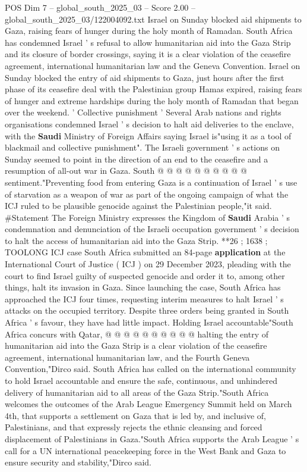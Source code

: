 \begin{textsample}{POS Dim 7 – global\_south\_2025\_03 – Score 2.00 – global\_south\_2025\_03/122004092.txt}  \label{ex:f7_pos_093}
Israel on Sunday blocked aid shipments to Gaza, raising fears of hunger during the holy month of Ramadan.
South Africa has condemned Israel ' s refusal to allow humanitarian aid into the Gaza Strip and its closure of border crossings, saying it is a clear violation of the ceasefire agreement, international humanitarian law and the Geneva Convention.
Israel on Sunday blocked the entry of aid shipments to Gaza, just hours after the first phase of its ceasefire deal with the Palestinian group Hamas expired, raising fears of hunger and extreme hardships during the holy month of Ramadan that began over the weekend. ' Collective punishment ' Several Arab nations and rights organisations condemned Israel ' s decision to halt aid deliveries to the enclave, with the \textbf{Saudi} Ministry of Foreign Affairs saying Israel is"using it as a tool of blackmail and collective punishment".
The Israeli government ' s actions on Sunday seemed to point in the direction of an end to the ceasefire and a resumption of all-out war in Gaza.
South @ @ @ @ @ @ @ @ @ @ sentiment."Preventing food from entering Gaza is a continuation of Israel ' s use of starvation as a weapon of war as part of the ongoing campaign of what the ICJ ruled to be plausible genocide against the Palestinian people,"it said. \#Statement The Foreign Ministry expresses the Kingdom of \textbf{Saudi} Arabia ' s condemnation and denunciation of the Israeli occupation government ' s decision to halt the access of humanitarian aid into the Gaza Strip. **26 ; 1638 ; TOOLONG ICJ case South Africa submitted an 84-page \textbf{application} at the International Court of Justice ( ICJ ) on 29 December 2023, pleading with the court to find Israel guilty of suspected genocide and order it to, among other things, halt its invasion in Gaza.
Since launching the case, South Africa has approached the ICJ four times, requesting interim measures to halt Israel ' s attacks on the occupied territory.
Despite three orders being granted in South Africa ' s favour, they have had little impact.
Holding Israel accountable"South Africa concurs with Qatar, @ @ @ @ @ @ @ @ @ @ halting the entry of humanitarian aid into the Gaza Strip is a clear violation of the ceasefire agreement, international humanitarian law, and the Fourth Geneva Convention,"Dirco said.
South Africa has called on the international community to hold Israel accountable and ensure the safe, continuous, and unhindered delivery of humanitarian aid to all areas of the Gaza Strip."South Africa welcomes the outcomes of the Arab League Emergency Summit held on March 4th, that supports a settlement on Gaza that is led by, and inclusive of, Palestinians, and that expressly rejects the ethnic cleansing and forced displacement of Palestinians in Gaza."South Africa supports the Arab League ' s call for a UN international peacekeeping force in the West Bank and Gaza to ensure security and stability,"Dirco said.

\end{textsample}
